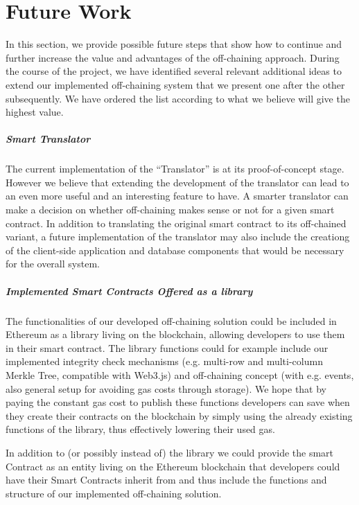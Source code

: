 \section{Future Work} \label{sec:future_work}

In this section, we provide possible future steps that show how to continue and further increase the value and advantages of the off-chaining approach. During the course of the project, we have identified several relevant additional ideas to extend our implemented off-chaining system that we present one after the other subsequently. We have ordered the list according to what we believe will give the highest value.

\subparagraph{Smart Translator}
The current implementation of the “Translator” is at its proof-of-concept stage. However we believe that extending the development of the translator can lead to an even more useful and an interesting feature to have. A smarter translator can make a decision on whether off-chaining makes sense or not for a given smart contract. In addition to translating the original smart contract to its off-chained variant, a future implementation of the translator may also include the creationg of the client-side application and database components that would be necessary for the overall system.

\subparagraph{Implemented Smart Contracts Offered as a library}
The functionalities of our developed off-chaining solution could be included in Ethereum as a library living on the blockchain, allowing developers to use them in their smart contract. The library functions could for example include our implemented integrity check mechanisms (e.g. multi-row and multi-column Merkle Tree, compatible with Web3.js) and off-chaining concept (with e.g. events, also general setup for avoiding gas costs through storage). We hope that by paying the constant gas cost to publish these functions developers can save when they create their contracts on the blockchain by simply using the already existing functions of the library, thus effectively lowering their used gas.

In addition to (or possibly instead of) the library we could provide the smart Contract as an entity living on the Ethereum blockchain that developers could have their Smart Contracts inherit from and thus include the functions and structure of our implemented off-chaining solution.

